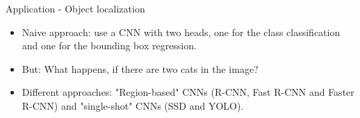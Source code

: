 \begin{vbframe}{Application - Object localization}
\begin{figure}
            \end{figure}
            \begin{itemize}
            \item Naive approach: use a CNN with two heads, one for the class classification and one for the bounding box regression.
            \item But: What happens, if there are two cats in the image?
                \item Different approaches: "Region-based" CNNs (R-CNN, Fast R-CNN and Faster R-CNN) and "single-shot" CNNs (SSD and YOLO).
            \end{itemize}

            \end{vbframe}
         


\endlecture
